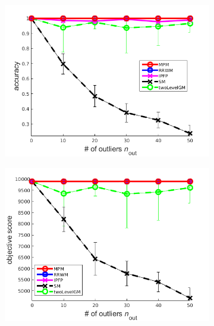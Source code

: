 \begin{figure}[h] 
	\begin{subfigure}[b]{0.3\textwidth}
		\centering
		\includegraphics[scale=0.25]{"chapter3/fig/SyntheticTest/no_descr/Results_v4.3.3/Test3/accuracy_avg10t"} 
	\end{subfigure}%
	\begin{subfigure}[b]{0.3\textwidth}
		\centering
		\includegraphics[scale=0.25]{"chapter3/fig/SyntheticTest/no_descr/Results_v4.3.3/Test3/score_avg10t"} 
	\end{subfigure} 
	\begin{subfigure}[b]{0.3\textwidth}
		\centering

\end{subfigure}
\end{figure}
